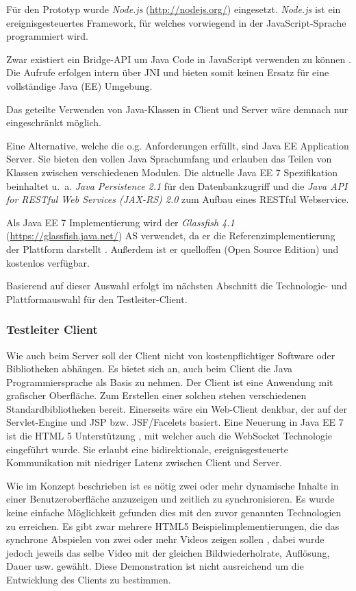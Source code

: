 Für den Prototyp wurde \emph{Node.js} (\url{http://nodejs.org/}) eingesetzt.
\emph{Node.js} ist ein ereignisgesteuertes Framework, für welches vorwiegend in der JavaScript-Sprache \cite[vgl.][]{Joyent.2014} programmiert wird.

Zwar existiert ein Bridge-\ac{API} um Java Code in JavaScript verwenden zu können .
Die Aufrufe erfolgen intern über \ac{JNI} und bieten somit keinen Ersatz für eine vollständige Java (EE) Umgebung. \cite[Vgl.][]{Ferner.2014}

Das geteilte Verwenden von Java-Klassen in Client und Server wäre demnach nur eingeschränkt möglich.

Eine Alternative, welche die o.g. Anforderungen erfüllt, sind Java EE Application Server.
Sie bieten den vollen Java Sprachumfang und erlauben das Teilen von Klassen zwischen verschiedenen Modulen.
Die aktuelle Java EE 7 Spezifikation beinhaltet u.~a. \emph{Java Persistence 2.1} für den Datenbankzugriff und die \emph{Java API for RESTful Web Services (JAX-RS) 2.0} zum Aufbau eines RESTful Webservice.
\cite[Vgl.][]{Oracle.2014}

Als Java EE 7 Implementierung wird der \emph{Glassfish 4.1} (\url{https://glassfish.java.net/})
\ac{AS} verwendet, da er die Referenzimplementierung der Plattform darstellt \cite[vgl.][14]{OracleCorporation.2013b}.
Außerdem ist er quelloffen (Open Source Edition) und kostenlos verfügbar.

Basierend auf dieser Auswahl erfolgt im nächsten Abschnitt die Technologie- und Plattformauswahl für den Testleiter-Client. 

\subsubsection{Testleiter Client}
Wie auch beim Server soll der Client nicht von kostenpflichtiger Software oder Bibliotheken abhängen.
Es bietet sich an, auch beim Client die Java Programmiersprache als Basis zu nehmen.
Der Client ist eine Anwendung mit grafischer Oberfläche.
Zum Erstellen einer solchen stehen verschiedenen Standardbibliotheken bereit.
Einerseits wäre ein Web-Client denkbar, der auf der Servlet-Engine und \ac{JSP} bzw. \ac{JSF}/Facelets basiert.
Eine Neuerung in Java EE 7 ist die \ac{HTML} 5 Unterstützung \cite[vgl.][5]{OracleCorporation.2013b}, mit welcher auch die WebSocket Technologie eingeführt wurde.
Sie erlaubt eine bidirektionale, ereignisgesteuerte Kommunikation mit niedriger Latenz zwischen Client und Server.

Wie im Konzept beschrieben ist es nötig zwei oder mehr dynamische Inhalte in einer Benutzeroberfläche anzuzeigen und zeitlich zu synchronisieren.
Es wurde keine einfache Möglichkeit gefunden dies mit den zuvor genannten Technologien zu erreichen.
Es gibt zwar mehrere HTML5 Beispielimplementierungen, die das synchrone Abspielen von zwei oder mehr Videos zeigen sollen \cite{Waldron.2011,HTML5demos.2011}, dabei wurde jedoch jeweils das selbe Video mit der gleichen Bildwiederholrate, Auflösung, Dauer usw. gewählt.
Diese Demonstration ist nicht ausreichend um die Entwicklung des Clients zu bestimmen.


